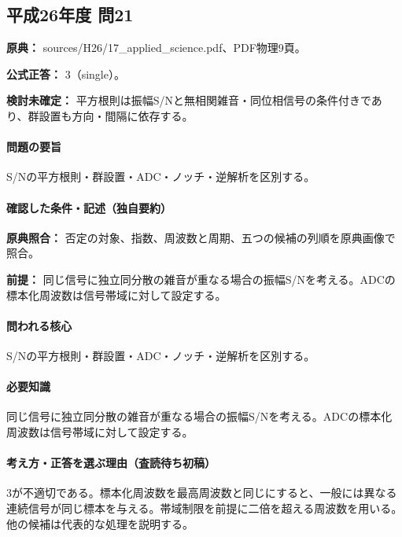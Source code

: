 \subsection{平成26年度 問21}
\label{q:h26-reg-applied-21}

\noindent\textbf{原典：} sources/H26/17\_applied\_science.pdf、PDF物理9頁。

\textbf{公式正答：} 3（single）。

\par\textbf{検討未確定：} 平方根則は振幅S/Nと無相関雑音・同位相信号の条件付きであり、群設置も方向・間隔に依存する。

\paragraph{問題の要旨} S/Nの平方根則・群設置・ADC・ノッチ・逆解析を区別する。

\paragraph{確認した条件・記述（独自要約）}\mbox{}\par

\noindent\textbf{原典照合：} 否定の対象、指数、周波数と周期、五つの候補の列順を原典画像で照合。\par

\noindent\textbf{前提：} 同じ信号に独立同分散の雑音が重なる場合の振幅S/Nを考える。ADCの標本化周波数は信号帯域に対して設定する。\par

\paragraph{問われる核心} S/Nの平方根則・群設置・ADC・ノッチ・逆解析を区別する。

\paragraph{必要知識} 同じ信号に独立同分散の雑音が重なる場合の振幅S/Nを考える。ADCの標本化周波数は信号帯域に対して設定する。

\paragraph{考え方・正答を選ぶ理由（査読待ち初稿）} 3が不適切である。標本化周波数を最高周波数と同じにすると、一般には異なる連続信号が同じ標本を与える。帯域制限を前提に二倍を超える周波数を用いる。他の候補は代表的な処理を説明する。

